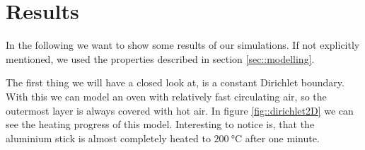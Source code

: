 
\section{\label{sec::results}Results}

In the following we want to show some results of our simulations. If not explicitly mentioned, we used the properties described in section \ref{sec::modelling}.

The first thing we will have a closed look at, is a constant Dirichlet boundary. With this we can model an oven with relatively fast circulating air, so the outermost layer is always covered with hot air. In figure \ref{fig::dirichlet2D} we can see the heating progress of this model. Interesting to notice is, that the aluminium stick is almost completely heated to $200\SI{}{\degreeCelsius}$ after one minute.

